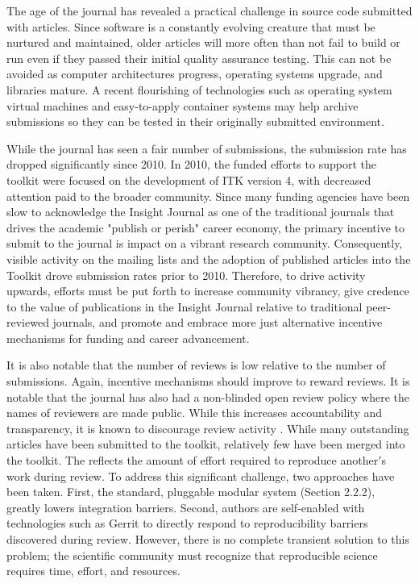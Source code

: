 \documentclass{frontiersENG} %
\begin{document}
The age of the journal has revealed a practical challenge in source code
submitted with articles. Since software is a constantly evolving creature that
must be nurtured and maintained, older articles will more often than not fail
to build or run even if they passed their initial quality assurance testing.
This can not be avoided as computer architectures progress, operating systems
upgrade, and libraries mature. A recent flourishing of technologies such as
operating system virtual machines and easy-to-apply container systems may help
archive submissions so they can be tested in their originally submitted
environment.

While the journal has seen a fair number of submissions, the submission rate
has dropped significantly since 2010. In 2010, the funded efforts to support
the toolkit were focused on the development of ITK version 4, with decreased
attention paid to the broader community.  Since many funding agencies have been
slow to acknowledge the Insight Journal as one of the traditional journals
that drives the academic "publish or perish" career economy, the primary
incentive to submit to the journal is impact on a vibrant research community.
Consequently, visible activity on the mailing lists and the adoption of published
articles into the Toolkit drove submission rates prior to 2010. Therefore, to
drive activity upwards, efforts must be put forth to increase community
vibrancy, give credence to the value of publications in the Insight Journal
relative to traditional peer-reviewed journals, and promote and embrace more
just alternative incentive mechanisms for funding and career advancement.

It is also notable that the number of reviews is low relative to the number of
submissions. Again, incentive mechanisms should improve to reward reviews.  It
is notable that the journal has also had a non-blinded open review policy where
the names of reviewers are made public. While this increases accountability and
transparency, it is known to discourage review activity
\cite{Rooyen1999,Walsh2000}. While many outstanding articles have been
submitted to the toolkit, relatively few have been merged into the toolkit.
The reflects the amount of effort required to reproduce another$'$s work during
review.  To address this significant challenge, two approaches have been taken.
First, the standard, pluggable modular system (Section 2.2.2), greatly lowers
integration barriers.  Second, authors are self-enabled with technologies such
as Gerrit to directly respond to reproducibility barriers discovered during
review. However, there is no complete transient solution to this problem; the
scientific community must recognize that reproducible science requires time,
effort, and resources.
\end{document}
